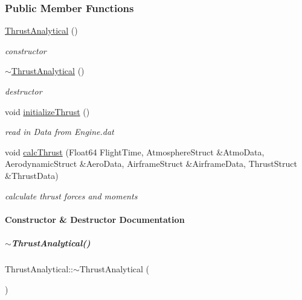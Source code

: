 \subsubsection*{Public Member Functions}
\begin{DoxyCompactItemize}
\item 
\mbox{\label{group___engine_a5c75949a22871e861090560adb2d5f18}} 
\hyperlink{group___engine_a5c75949a22871e861090560adb2d5f18}{Thrust\+Analytical} ()
\begin{DoxyCompactList}\small\item\em constructor \end{DoxyCompactList}\item 
\hyperlink{group___engine_aeaf9dd69c10812c673d6cfae0d7ca4fd}{$\sim$\+Thrust\+Analytical} ()
\begin{DoxyCompactList}\small\item\em destructor \end{DoxyCompactList}\item 
void \hyperlink{group___engine_a5c1db29b00aa92e9f22806b0ea482e05}{initialize\+Thrust} ()
\begin{DoxyCompactList}\small\item\em read in Data from Engine.\+dat \end{DoxyCompactList}\item 
void \hyperlink{group___engine_a521b775b57dc2324f09496efb8b12452}{calc\+Thrust} (Float64 Flight\+Time, Atmosphere\+Struct \&Atmo\+Data, Aerodynamic\+Struct \&Aero\+Data, Airframe\+Struct \&Airframe\+Data, Thrust\+Struct \&Thrust\+Data)
\begin{DoxyCompactList}\small\item\em calculate thrust forces and moments \end{DoxyCompactList}\end{DoxyCompactItemize}


\paragraph{Constructor \& Destructor Documentation}
\mbox{\label{group___engine_aeaf9dd69c10812c673d6cfae0d7ca4fd}} 
\subparagraph{\texorpdfstring{$\sim$\+Thrust\+Analytical()}{~ThrustAnalytical()}}
{\footnotesize\ttfamily Thrust\+Analytical\+::$\sim$\+Thrust\+Analytical (\begin{DoxyParamCaption}{ }\end{DoxyParamCaption})}



